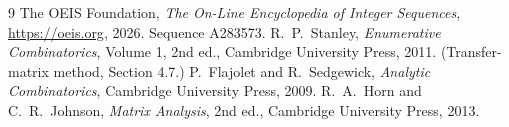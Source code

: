 \documentclass[11pt,a4paper]{article}
\theoremstyle{plain}
\theoremstyle{definition}
\begin{document}
\begin{thebibliography}{9}
 The OEIS Foundation, \emph{The On-Line Encyclopedia of Integer
Sequences}, \url{https://oeis.org}, 2026. Sequence A283573.
 R.~P.~Stanley, \emph{Enumerative Combinatorics}, Volume 1, 2nd ed.,
Cambridge University Press, 2011. (Transfer-matrix method, Section 4.7.)
 P.~Flajolet and R.~Sedgewick, \emph{Analytic Combinatorics}, Cambridge
University Press, 2009.
 R.~A.~Horn and C.~R.~Johnson, \emph{Matrix Analysis}, 2nd ed., Cambridge
University Press, 2013.
\end{thebibliography}
\end{document}
